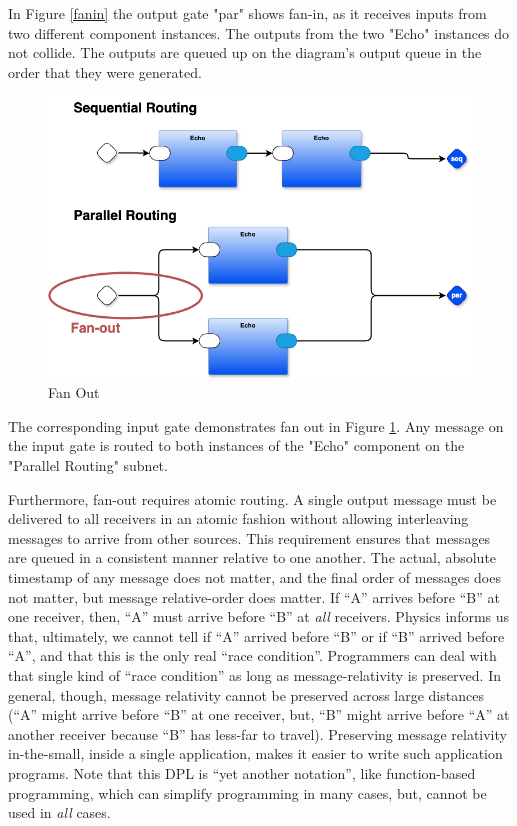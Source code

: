 \documentclass[10pt,anonymous,review]{acmart}
\begin{document}
In Figure \ref{fanin} the output gate "par" shows fan-in, as it receives inputs from two different component instances. The outputs from the two "Echo" instances do not collide. The outputs are queued up on the diagram's output queue in the order that they were generated.


  \begin{figure}
    \includegraphics[scale=0.1]{./media/fanout.png}
    \caption{Fan Out}
    \label{fanout}
  \end{figure}
The corresponding input gate demonstrates fan out in Figure \ref{fanout}. Any message on the input gate is routed to both instances of the "Echo" component on the "Parallel Routing" subnet.


Furthermore, fan-out requires atomic routing. A single output message must be delivered to all receivers in an atomic fashion without allowing interleaving messages to arrive from other sources. This requirement ensures that messages are queued in a consistent manner relative to one another. The actual, absolute timestamp of any message does not matter, and the final order of messages does not matter, but message relative-order does matter. If “A” arrives before “B” at one receiver, then, “A” must arrive before “B” at \emph{all} receivers. Physics informs us that, ultimately, we cannot tell if “A” arrived before “B” or if “B” arrived before “A”, and that this is the only real “race condition”. Programmers can deal with that single kind of “race condition” as long as message-relativity is preserved. In general, though, message relativity cannot be preserved across large distances (“A” might arrive before “B” at one receiver, but, “B” might arrive before “A” at another receiver because “B” has less-far to travel). Preserving message relativity in-the-small, inside a single application, makes it easier to write such application programs. Note that this DPL is “yet another notation”, like function-based programming, which can simplify programming in many cases, but, cannot be used in \emph{all} cases.
\end{document}
